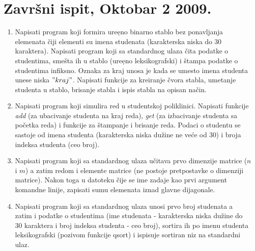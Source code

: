 \section{Zavr\v{s}ni ispit, Oktobar 2 2009.}



\begin{enumerate}

\item Napisati program koji formira ure\d eno binarno stablo bez
ponavljanja elemenata \v ciji elementi su imena studenata
(karakterska niska do $30$ karaktera). Napisati program koji sa
standardnog ulaza \v cita podatke o studentima, sme\v sta ih u
stablo (ure\d eno leksikografski) i \v stampa podatke o studentima
infiksno. Oznaka za kraj unosa je kada se umesto imena studenta
unese niska $"kraj"$. Napisati funkcije za kreiranje \v cvora
stabla, umetanje studenta u stablo, brisanje stabla i ispis stabla
na opisan na\v cin.

\item Napisati program koji simulira red u studentskoj poliklinici.
Napisati funkcije \emph{add} (za ubacivanje studenta na kraj
reda), \emph{get} (za izbacivanje studenta sa po\v cetka reda) i
funkcije za \v stampanje i brisanje reda. Podaci o studentu se
sastoje od imena studenta (karakterska niska du\v zine ne ve\' ce
od $30$) i broja indeksa studenta (ceo broj).

\item Napisati program koji sa standardnog ulaza u\v citava prvo
dimenzije matrice ($n$ i $m$) a zatim redom i elemente matrice (ne
postoje pretpostavke o dimenziji matrice). Nakon toga u datoteku
\v cije se ime zadaje kao prvi argument komandne linije, zapisati
sumu elemenata iznad glavne dijagonale.

\item Napisati program koji sa standardnog ulaza unosi prvo broj studenata
a zatim i podatke o studentima (ime studenata - karakterska niska
du\v zine do $30$ karaktera i broj indeksa studenta - ceo broj),
sortira ih po imenu studenta leksikografski (pozivom funkcije
qsort) i ispisuje sortiran niz na standardni ulaz.
\end{enumerate}

